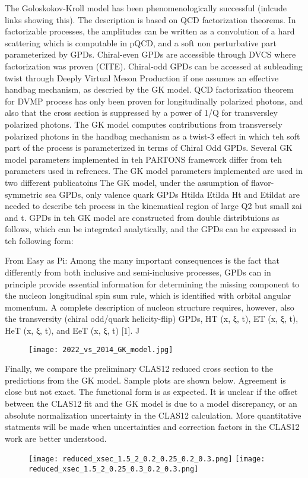 The Goloskokov-Kroll model has been phenomenologically successful (inlcude links showing this).  The description is based on QCD factorization theorems. In factorizable processes, the amplitudes can be written as a convolution of a hard scattering which is computable in pQCD, and a soft non perturbative part parameterized by GPDs. Chiral-even GPDs are accessible through DVCS where factorization was proven (CITE). Chiral-odd GPDs can be accessed at subleading twist through Deeply Virtual Meson Production if one assumes an effective handbag mechanism, as descried by the GK model. 
QCD factorization theorem for DVMP process has only been proven for longitudinally polarized photons, and also that the cross section is suppressed by a power of 1/Q for transversley polarized photons. 
The GK model computes contributions from transversely polarized photons in the handbag mechanism as a twist-3 effect in which teh soft part of the process is parameterized in terms of Chiral Odd GPDs.
Several GK model parameters implemented in teh PARTONS framework differ from teh parameters used in refrences. The GK model parameters implemented are used in two different publicatoins
The GK model, under the assumption of flavor-symmetric sea GPDs, only valence quark GPDs Htilda Etilda Ht and Etildat are needed to describe teh process in the kinematical region of large Q2 but small zai and t. GPDs in teh GK model are constructed from double distribtuions as follows, which can be integrated analytically, and the GPDs can be expressed in teh following form:


From Easy as Pi:
Among the many important consequences is the fact that differently from both inclusive and semi-inclusive processes, GPDs can in principle provide essential information
for determining the missing component to the nucleon longitudinal spin sum rule, which
is identified with orbital angular momentum. A complete description of nucleon structure
requires, however, also the transversity (chiral odd/quark helicity-flip) GPDs, HT (x, ξ, t),
ET (x, ξ, t), HeT (x, ξ, t), and EeT (x, ξ, t) [1]. J


\begin{figure}[hbt]
	\centering
	\texttt{[image: 2022\_vs\_2014\_GK\_model.jpg]}
\end{figure}\label{fig:oldres2}

Finally, we compare the preliminary CLAS12 reduced cross section to the predictions from the GK model. Sample plots are shown below. Agreement is close but not exact. The functional form is as expected. It is unclear if the offset between the CLAS12 fit and the GK model is due to a model discrepancy, or an absolute normalization uncertainty in the CLAS12 calculation. More quantitative statments will be made when uncertainties and correction factors in the CLAS12 work are better understood.
\begin{figure}[hbt]
	\centering
	\texttt{[image: reduced\_xsec\_1.5\_2\_0.2\_0.25\_0.2\_0.3.png]}
	\texttt{[image: reduced\_xsec\_1.5\_2\_0.25\_0.3\_0.2\_0.3.png]}
\end{figure}\label{fig:oldres}


\begin{figure}[hbt]
	\centering
	
\end{figure}\label{fig:oldres}


